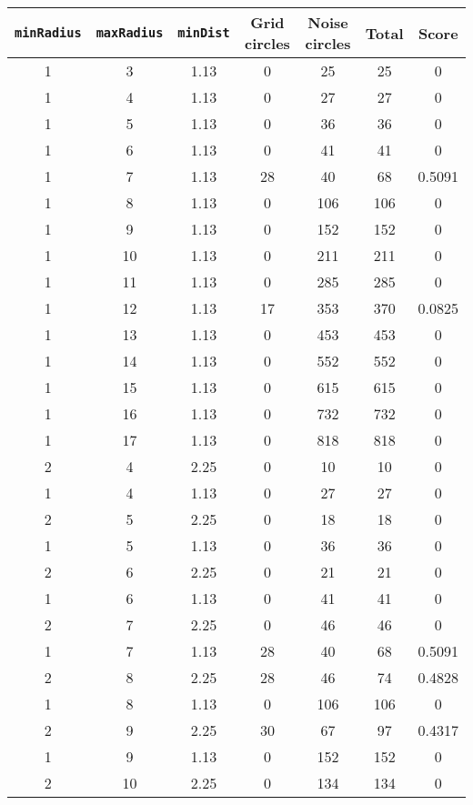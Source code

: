 \documentclass[letterpaper, 12pt]{article}
\begin{document}
\begin{longtable}{|c|c|c|c|c|c|c|}
\hline
\textbf{\texttt{minRadius}} & \textbf{\texttt{maxRadius}} & \textbf{\texttt{minDist}} & \textbf{Grid circles} & \textbf{Noise circles} & \textbf{Total} & \textbf{Score} \\
\hline
1 & 3 & 1.13 & 0 & 25 & 25 & 0 \\
\hline
1 & 4 & 1.13 & 0 & 27 & 27 & 0 \\
\hline
1 & 5 & 1.13 & 0 & 36 & 36 & 0 \\
\hline
1 & 6 & 1.13 & 0 & 41 & 41 & 0 \\
\hline
1 & 7 & 1.13 & 28 & 40 & 68 & 0.5091 \\
\hline
1 & 8 & 1.13 & 0 & 106 & 106 & 0 \\
\hline
1 & 9 & 1.13 & 0 & 152 & 152 & 0 \\
\hline
1 & 10 & 1.13 & 0 & 211 & 211 & 0 \\
\hline
1 & 11 & 1.13 & 0 & 285 & 285 & 0 \\
\hline
1 & 12 & 1.13 & 17 & 353 & 370 & 0.0825 \\
\hline
1 & 13 & 1.13 & 0 & 453 & 453 & 0 \\
\hline
1 & 14 & 1.13 & 0 & 552 & 552 & 0 \\
\hline
1 & 15 & 1.13 & 0 & 615 & 615 & 0 \\
\hline
1 & 16 & 1.13 & 0 & 732 & 732 & 0 \\
\hline
1 & 17 & 1.13 & 0 & 818 & 818 & 0 \\
\hline
2 & 4 & 2.25 & 0 & 10 & 10 & 0 \\
\hline
1 & 4 & 1.13 & 0 & 27 & 27 & 0 \\
\hline
2 & 5 & 2.25 & 0 & 18 & 18 & 0 \\
\hline
1 & 5 & 1.13 & 0 & 36 & 36 & 0 \\
\hline
2 & 6 & 2.25 & 0 & 21 & 21 & 0 \\
\hline
1 & 6 & 1.13 & 0 & 41 & 41 & 0 \\
\hline
2 & 7 & 2.25 & 0 & 46 & 46 & 0 \\
\hline
1 & 7 & 1.13 & 28 & 40 & 68 & 0.5091 \\
\hline
2 & 8 & 2.25 & 28 & 46 & 74 & 0.4828 \\
\hline
1 & 8 & 1.13 & 0 & 106 & 106 & 0 \\
\hline
2 & 9 & 2.25 & 30 & 67 & 97 & 0.4317 \\
\hline
1 & 9 & 1.13 & 0 & 152 & 152 & 0 \\
\hline
2 & 10 & 2.25 & 0 & 134 & 134 & 0 \\

\end{longtable}
\end{document}
